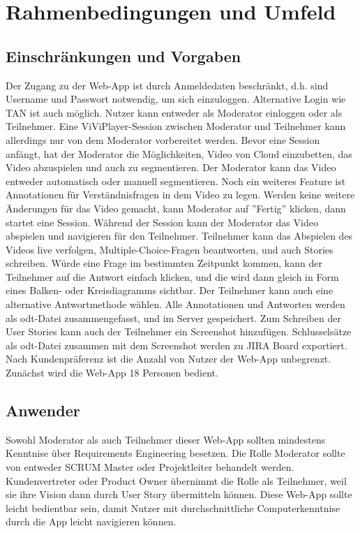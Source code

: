 \section{Rahmenbedingungen und Umfeld}

\subsection{Einschränkungen und Vorgaben}
Der Zugang zu der Web-App ist durch Anmeldedaten beschränkt, d.h. sind Username und Passwort notwendig, um sich einzuloggen. Alternative Login wie TAN ist auch möglich. Nutzer kann entweder als Moderator einloggen oder als Teilnehmer. Eine ViViPlayer-Session zwischen Moderator und Teilnehmer kann allerdings nur von dem Moderator vorbereitet werden.\linebreak
\linebreak
Bevor eine Session anfängt, hat der Moderator die Möglichkeiten, Video von Cloud einzubetten, das Video abzuspielen und auch zu segmentieren. Der Moderator kann das Video entweder automatisch oder manuell segmentieren. Noch ein weiteres Feature ist Annotationen für Verständnisfragen in dem Video zu legen. Werden keine weitere Änderungen für das Video gemacht, kann Moderator auf ''Fertig'' klicken, dann startet eine Session.\linebreak
\linebreak
Während der Session kann der Moderator das Video abspielen und navigieren für den Teilnehmer. Teilnehmer kann das Abspielen des Videos live verfolgen, Multiple-Choice-Fragen beantworten, und auch Stories schreiben. Würde eine Frage im bestimmten Zeitpunkt kommen, kann der Teilnehmer auf die Antwort einfach klicken, und die wird dann gleich in Form eines Balken- oder Kreisdiagramms sichtbar. Der Teilnehmer kann auch eine alternative Antwortmethode wählen. Alle Annotationen und Antworten werden als odt-Datei zusammengefasst, und im Server gespeichert. Zum Schreiben der User Stories kann auch der Teilnehmer ein Screenshot hinzufügen. Schlusselsätze als odt-Datei zusammen mit dem Screenshot werden zu JIRA Board exportiert.\linebreak
\linebreak
Nach Kundenpräferenz ist die Anzahl von Nutzer der Web-App unbegrenzt. Zunächst wird die Web-App 18 Personen bedient.

\subsection{Anwender}
Sowohl Moderator als auch Teilnehmer dieser Web-App sollten mindestens Kenntnise über Requirements Engineering besetzen. Die Rolle Moderator sollte von entweder SCRUM Master oder Projektleiter behandelt werden. Kundenvertreter oder Product Owner übernimmt die Rolle als Teilnehmer, weil sie ihre Vision dann durch User Story übermitteln können. Diese Web-App sollte leicht bedientbar sein, damit Nutzer mit durchschnittliche Computerkenntnise durch die App leicht navigieren können.

